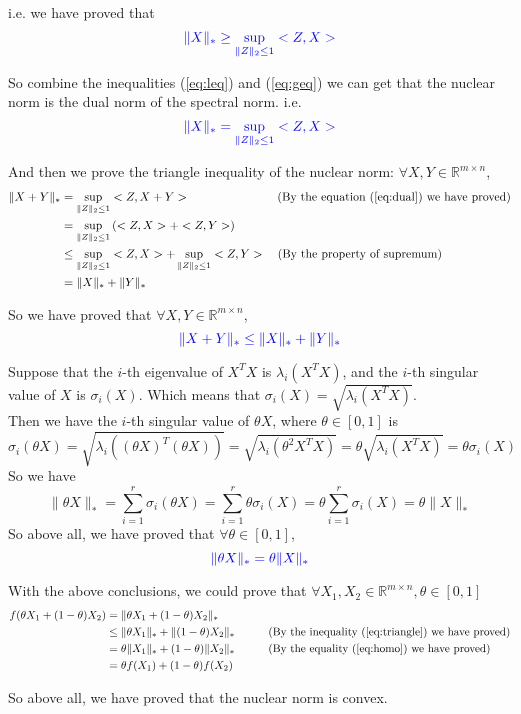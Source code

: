 \begin{itemize}
i.e. we have proved that
\begin{equation}
\textcolor{blue}{\|X\|_* \geq \sup_{\|Z\|_2 \leq 1} <Z,X>}
\label{eq:geq}
\end{equation}

So combine the inequalities (\ref{eq:leq}) and (\ref{eq:geq}) we can get that the nuclear norm is the dual norm of the spectral norm. i.e.
\begin{equation}
\textcolor{blue}{\|X\|_* = \sup_{\|Z\|_2 \leq 1} <Z,X>}
\label{eq:dual}
\end{equation}


And then we prove the triangle inequality of the nuclear norm: $\forall X,Y\in\mathbb{R}^{m\times n}$,
\begin{align*}
\|X+Y\|_* &= \sup_{\|Z\|_2 \leq 1} <Z,X+Y> \text{\quad\quad\quad\quad\quad\quad\quad\  (By the equation (\ref{eq:dual}) we have proved)} \\
&= \sup_{\|Z\|_2 \leq 1} \left(<Z,X>+<Z,Y>\right) \\
&\leq \sup_{\|Z\|_2 \leq 1} <Z,X> + \sup_{\|Z\|_2 \leq 1} <Z,Y> \text{\quad (By the property of supremum)} \\
&= \|X\|_* + \|Y\|_*
\end{align*}

So we have proved that $\forall X,Y\in\mathbb{R}^{m\times n}$,
\begin{equation}
\textcolor{blue}{\|X+Y\|_* \leq \|X\|_* + \|Y\|_*}
\label{eq:triangle}
\end{equation}


Suppose that the $i$-th eigenvalue of $X^TX$ is $\lambda_i(X^TX)$, and the $i$-th singular value of $X$ is $\sigma_i(X)$. Which means that $\sigma_i(X)=\sqrt{\lambda_i(X^TX)}$. \\
Then we have the $i$-th singular value of $\theta X$, where $\theta\in[0,1]$ is
$$\sigma_i(\theta X)=\sqrt{\lambda_i((\theta X)^T(\theta X))}=\sqrt{\lambda_i(\theta^2X^TX)}=\theta\sqrt{\lambda_i(X^TX)}=\theta\sigma_i(X)$$
So we have
$$\|\theta X\|_* = \sum_{i=1}^{r}\sigma_i(\theta X) = \sum_{i=1}^{r}\theta\sigma_i(X) = \theta\sum_{i=1}^{r}\sigma_i(X) = \theta\|X\|_*$$
So above all, we have proved that $\forall\theta\in[0,1]$,
\begin{equation}
\textcolor{blue}{\|\theta X\|_* = \theta\|X\|_*}
\label{eq:homo}
\end{equation}


With the above conclusions, we could prove that $\forall X_1,X_2\in\mathbb{R}^{m\times n}, \theta\in[0,1]$
\begin{align*}
f(\theta X_1 + (1-\theta)X_2) &= \|\theta X_1 + (1-\theta)X_2\|_* \\
&\leq \|\theta X_1\|_* + \|(1-\theta)X_2\|_* \text{\quad\quad\quad (By the inequality (\ref{eq:triangle}) we have proved)} \\
&= \theta\|X_1\|_* + (1-\theta)\|X_2\|_* \text{\quad\quad\quad (By the equality (\ref{eq:homo}) we have proved)} \\
&= \theta f(X_1) + (1-\theta)f(X_2)
\end{align*}

So above all, we have proved that the nuclear norm is convex.

\end{itemize}

\newpage
